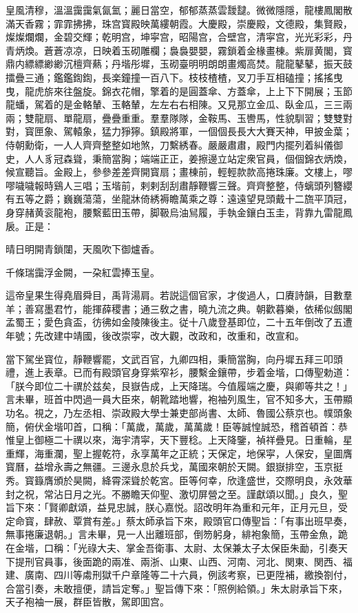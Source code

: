 皇風清穆，溫溫靄靄氣氤氳；麗日當空，郁郁蒸蒸雲靉靆。微微隱隱，龍樓鳳閣散滿天香霧；霏霏拂拂，珠宫寳殿映萬縷朝霞。大慶殿，崇慶殿，文德殿，集賢殿，燦燦爛爛，金碧交輝；乾明宫，坤寜宫，昭陽宫，合壁宫，清寜宫，光光彩彩，丹青炳煥。蒼蒼凉凉，日映着玉砌雕欄；裊裊嬰嬰，霧鎖着金椽畫棟。紫扉黄閣，寳鼎内縹縹緲緲沉檀齊爇；丹堦彤墀，玉砌臺明明朗朗畫燭高焚。龍龍鼕鼕，振天鼓擂疊三通；鑑鑑鍧鍧，長楽鐘撞一百八下。枝枝楂楂，叉刀手互相磕撞；搖搖曳曳，龍虎旂來往盤旋。錦衣花帽，擎着的是圓蓋傘、方蓋傘，上上下下開展；玉節龍蟠，駕着的是金輅輦、玉輅輦，左左右右相陳。又見那立金瓜、臥金瓜，三三兩兩；雙龍扇、單龍扇，疊疊重重。羣羣隊隊，金鞍馬、玉轡馬，性貌馴習；雙雙對對，寳匣象、駕轅象，猛力猙獰。鎮殿將軍，一個個長長大大賽天神，甲披金葉；侍朝勳衛，一人人齊齊整整如地煞，刀繫綉春。嚴嚴肅肅，殿門内擺列着糾儀御史，人人豸冠森聳，秉簡當胸；端端正正，姜擦邊立站定衆官員，個個錦衣炳煥，候宣聽旨。金殿上，參參差差齊開寳扇；畫棟前，輕輕款款高捲珠廉。文樓上，嘐嘐噦噦報時鷄人三唱；玉堦前，剌剌刮刮肅靜鞭響三聲。齊齊整整，侍螭頭列簪纓有五等之爵；巍巍蕩蕩，坐龍牀倚綉褥瞻萬乘之尊：遠遠望見頭戴十二旒平頂冠，身穿赭黄衮龍袍，腰繫藍田玉帶，脚靸烏油舃履，手執金鑲白玉圭，背靠九雷龍鳳扆。正是：

晴日明開青鎖闥，天風吹下御爐香。

千條瑞靄浮金闕，一朶紅雲捧玉皇。

這帝皇果生得堯眉舜目，禹背湯肩。若説這個官家，才俊過人，口賡詩韻，目數羣羊；善寫墨君竹，能揮薛稷書；通三敎之書，曉九流之典。朝歡暮樂，依稀似劔閣孟蜀王；愛色貪盃，彷彿如金陵陳後主。従十八歲登基即位，二十五年倒改了五遭年號；先改建中靖國，後改崇寜，改大觀，改政和，改重和，改宣和。

當下駕坐寳位，靜鞭響罷，文武百官，九卿四相，秉簡當胸，向丹墀五拜三叩頭禮，進上表章。已而有殿頭官身穿紫窄衫，腰繫金鑲帶，步着金堦，口傳聖勅道：「朕今即位二十禩於兹矣，艮嶽告成，上天降瑞。今值履端之慶，與卿等共之！」言未畢，班首中閃過一員大臣來，朝靴踏地響，袍袖列風生，官不知多大，玉帶顯功名。視之，乃左丞相、崇政殿大學士兼吏部尚書、太師、魯國公蔡京也。幞頭象簡，俯伏金堦叩首，口稱：「萬歲，萬歲，萬萬歲！臣等誠惶誠恐，稽首頓首：恭惟皇上御極二十禩以來，海宇清寜，天下豐稔。上天降鑒，禎祥疊見。日重輪，星重輝，海重瀾，聖上握乾符，永享萬年之正統；天保定，地保寜，人保安，皇圖膺寳曆，益增永壽之無疆。三邊永息於兵戈，萬國來朝於天闕。銀嶽排空，玉京挺秀。寳籙膺頒於昊闕，絳霄深聳於乾宮。臣等何幸，欣逢盛世，交際明良，永效華封之祝，常沾日月之光。不勝瞻天仰聖、激切屏營之至。謹獻頌以聞。」良久，聖旨下來：「賢卿獻頌，益見忠誠，朕心嘉悦。詔改明年為重和元年，正月元旦，受定命寳，肆赦、覃賞有差。」蔡太師承旨下來，殿頭官口傳聖旨：「有事出班早奏，無事捲廉退朝。」言未畢，見一人出離班部，倒笏躬身，緋袍象簡，玉帶金魚，跪在金堦，口稱：「光祿大夫、掌金吾衛事、太尉、太保兼太子太保臣朱勔，引奏天下提刑官員事，後面跪的兩准、兩浙、山東、山西、河南、河北、関東、関西、福建、廣南、四川等䖏刑獄千户章隆等二十六員，例該考察，已更陞補，繳換劄付，合當引奏，未敢擅便，請旨定奪。」聖旨傳下來：「照例給領。」朱太尉承旨下來，天子袍袖一展，群臣皆散，駕即囬宫。

